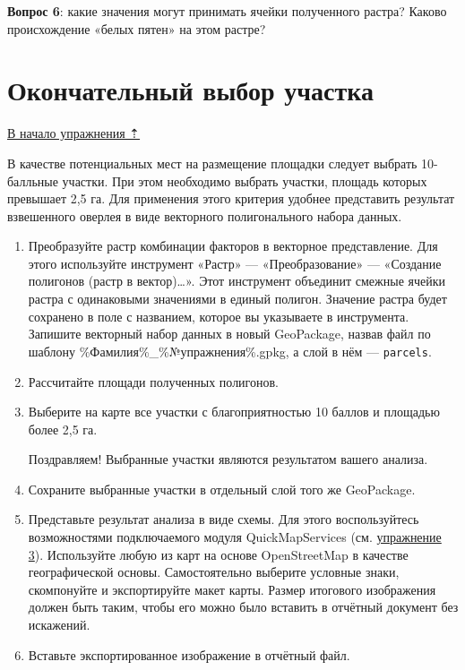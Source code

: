 \documentclass[
  12pt,
]{book}
\begin{document}
\textbf{Вопрос 6}: какие значения могут принимать ячейки полученного растра? Каково происхождение «белых пятен» на этом растре?

\hypertarget{weighted-overlay-final-decision}{%
\section{Окончательный выбор участка}\label{weighted-overlay-final-decision}}

\protect\hyperlink{weighted-overlay}{В начало упражнения ⇡}

В качестве потенциальных мест на размещение площадки следует выбрать 10-балльные участки. При этом необходимо выбрать участки, площадь которых превышает 2,5 га. Для применения этого критерия удобнее представить результат взвешенного оверлея в виде векторного полигонального набора данных.

\begin{enumerate}
\def\labelenumi{\arabic{enumi}.}
\item
  Преобразуйте растр комбинации факторов в векторное представление. Для этого используйте инструмент «Растр» --- «Преобразование» --- «Создание полигонов (растр в вектор)\ldots». Этот инструмент объединит смежные ячейки растра с одинаковыми значениями в единый полигон. Значение растра будет сохранено в поле с названием, которое вы указываете в инструмента. Запишите векторный набор данных в новый GeoPackage, назвав файл по шаблону \%Фамилия\%\_\%№упражнения\%.gpkg, а слой в нём --- \texttt{parcels}.
\item
  Рассчитайте площади полученных полигонов.
\item
  Выберите на карте все участки с благоприятностью 10 баллов и площадью более 2,5 га.

  Поздравляем! Выбранные участки являются результатом вашего анализа.
\item
  Сохраните выбранные участки в отдельный слой того же GeoPackage.
\item
  Представьте результат анализа в виде схемы. Для этого воспользуйтесь возможностями подключаемого модуля QuickMapServices (см. \protect\hyperlink{map-ref-districts-wms}{упражнение 3}). Используйте любую из карт на основе OpenStreetMap в качестве географической основы. Самостоятельно выберите условные знаки, скомпонуйте и экспортируйте макет карты. Размер итогового изображения должен быть таким, чтобы его можно было вставить в отчётный документ без искажений.
\item
  Вставьте экспортированное изображение в отчётный файл.
\end{enumerate}
\end{document}
